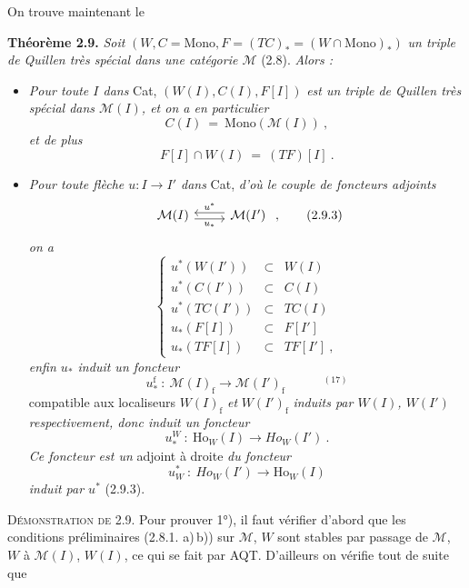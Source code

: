 \documentclass[11pt]{article}
\newcommand{\printedpage}[1]{\marginpar{\footnotesize p.~#1}}
\newcommand{\msp}[1]{\marginpar{\footnotesize [#1]}}
\newcommand{\Ho}{\mathrm{Ho}}
\newcommand{\Mono}{\mathrm{Mono}}
\begin{document}
On trouve maintenant le

\textbf{Théorème 2.9.} \textit{Soit} $(W, C = \Mono, F = (TC)_* = (W\cap\Mono)_*)$ \textit{un triple de Quillen très spécial dans une catégorie $\mathcal{M}$} (2.8). \textit{Alors :}
\begin{itemize}[leftmargin=2.5em]
\item[1°)] \textit{Pour toute $I$ dans} Cat, $(W(I),C(I),F[I])$ \textit{est un triple de Quillen très spécial dans $\mathcal{M}(I)$, et on a en particulier}
\[ C(I) \ = \ \Mono(\mathcal{M}(I))\ , \tag*{(2.9.1)} \]
\textit{et de plus}
\[ F[I]\cap W(I) \ = \ (TF)[I]\ . \tag*{(2.9.2)} \]
\item[2°)] \textit{Pour toute flèche $u : I \longrightarrow I'$ dans} Cat, \textit{d'où le couple de foncteurs adjoints}
\[ \begin{tikzcd}
\mathcal{M}(I) \arrow[r, shift right, "u_*"'] & \mathcal{M}(I') \arrow[l, shift right, "u^*"']
\end{tikzcd}\ , \tag*{(2.9.3)} \]
\textit{on a}
\[ \left\{ \begin{array}{rcl}
u^*(W(I')) & \subset & W(I)\\
u^*(C(I')) & \subset & C(I)\\
u^*(TC(I')) & \subset & TC(I)\\
u_*(F[I]) & \subset & F[I']\\
u_*(TF[I]) & \subset & TF[I']\ ,
\end{array}\right. \tag*{(2.9.4)} \]
\textit{enfin $u_*$ induit un foncteur}
\printedpage{18}
\msp{page 29}
\[ u_*^{\mathrm{f}} \ :\ \mathcal{M}(I)_{\mathrm{f}} \longrightarrow \mathcal{M}(I')_{\mathrm{f}} \qquad\quad ^{(17)} \tag*{(2.9.5)} \]
compatible aux localiseurs $W(I)_{\mathrm{f}}$ \textit{et} $W(I')_{\mathrm{f}}$ \textit{induits par $W(I)$, $W(I')$ respectivement, donc induit un foncteur}
\[ u_*^W \ :\ \Ho_W(I) \longrightarrow \mathit{Ho}_W(I')\ . \tag*{(2.9.6)} \] %
\textit{Ce foncteur est un} adjoint à droite \textit{du foncteur}
\[ u_W^* \ :\ \mathit{Ho}_W(I') \longrightarrow \Ho_W(I) \tag*{(2.9.7)} \] %
\textit{induit par $u^*$} (2.9.3).
\end{itemize}
\textsc{Démonstration de 2.9.} Pour prouver 1°), il faut vérifier d'abord que les conditions préliminaires (2.8.1. a)\,b)) sur $\mathcal{M}$, $W$ sont stables par passage de $\mathcal{M}$, $W$ à $\mathcal{M}(I)$, $W(I)$, ce qui se fait par AQT. D'ailleurs on vérifie tout de suite que
\end{document}
